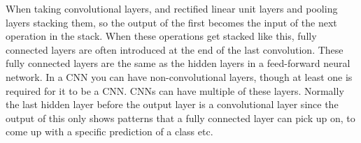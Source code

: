 When taking convolutional layers, and rectified linear unit layers and pooling layers stacking them, so the output of the first becomes the input of the next operation in the stack. When these operations get stacked like this, fully connected layers are often introduced at the end of the last convolution. These fully connected layers are the same as the hidden layers in a feed-forward neural network. In a CNN you can have non-convolutional layers, though at least one is required for it to be a CNN. CNNs can have multiple of these layers. Normally the last hidden layer before the output layer is a convolutional layer since the output of this only shows patterns that a fully connected layer can pick up on, to come up with a specific prediction of a class etc.
